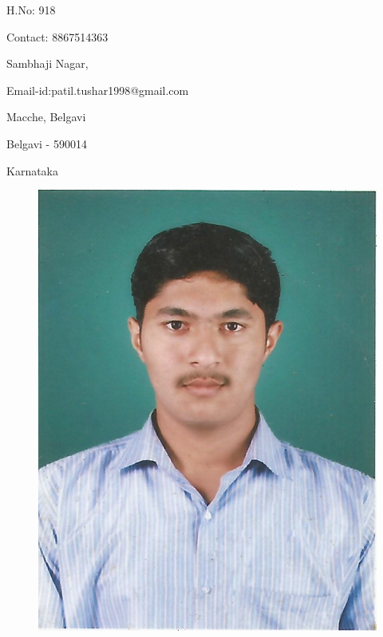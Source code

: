 \documentclass{article}
\begin{document}
	
	\begin{minipage}{2in}
	H.No: 918
	\end{minipage}
	\hfill
	\begin{minipage}{2.25in}
	Contact: 8867514363
	\end{minipage}

	
	\begin{minipage}{2in}
	Sambhaji Nagar,
	\end{minipage}
	\hfill
	Email-id:patil.tushar1998@gmail.com
	
	\begin{minipage}{2in}
	Macche, Belgavi
	\end{minipage}
	
	\begin{minipage}{2in}
	Belgavi - 590014
	\end{minipage}

	\begin{minipage}{2in}
	Karnataka
	\end{minipage}

	\begin{figure}[h!]
		\hfill
		\includegraphics[scale = 0.6]{profilepic.jpg}
		\label{image_1} %
	\end{figure}
	
\end{document}
